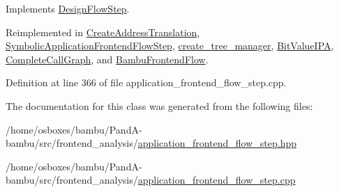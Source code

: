Implements \hyperlink{classDesignFlowStep_a1783abe0c1d162a52da1e413d5d1ef05}{Design\+Flow\+Step}.



Reimplemented in \hyperlink{classCreateAddressTranslation_a3570b8c94b6ff002652bffa0353cb977}{Create\+Address\+Translation}, \hyperlink{classSymbolicApplicationFrontendFlowStep_a113fcb0dca5cdd6e2be02252be23b0e7}{Symbolic\+Application\+Frontend\+Flow\+Step}, \hyperlink{classcreate__tree__manager_ab0dc851ab662326a6d0a5ecfeba7d663}{create\+\_\+tree\+\_\+manager}, \hyperlink{classBitValueIPA_aaf4e7bb4cee74b03ae5e8fd94e593f2d}{Bit\+Value\+I\+PA}, \hyperlink{classCompleteCallGraph_a8380495bcddb634f538066b11d927d70}{Complete\+Call\+Graph}, and \hyperlink{classBambuFrontendFlow_a44511aa9719eca10142e1e736dec5f08}{Bambu\+Frontend\+Flow}.



Definition at line 366 of file application\+\_\+frontend\+\_\+flow\+\_\+step.\+cpp.



The documentation for this class was generated from the following files\+:\begin{DoxyCompactItemize}
\item 
/home/osboxes/bambu/\+Pand\+A-\/bambu/src/frontend\+\_\+analysis/\hyperlink{application__frontend__flow__step_8hpp}{application\+\_\+frontend\+\_\+flow\+\_\+step.\+hpp}\item 
/home/osboxes/bambu/\+Pand\+A-\/bambu/src/frontend\+\_\+analysis/\hyperlink{application__frontend__flow__step_8cpp}{application\+\_\+frontend\+\_\+flow\+\_\+step.\+cpp}\end{DoxyCompactItemize}
